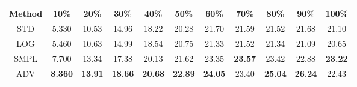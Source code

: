 \documentclass{standalone}
\begin{document}
\begin{tabular}{c|cccccccccc}
      \toprule
      Method & 10\% & 20\% & 30\% & 40\% & 50\% & 60\% & 70\% & 80\% & 90\% & 100\% \\
      \midrule
STD & 5.330 & 10.53 & 14.96 & 18.22 & 20.28 & 21.70 & 21.59 & 21.52 & 21.68 & 21.10\\
LOG & 5.460 & 10.63 & 14.99 & 18.54 & 20.75 & 21.33 & 21.52 & 21.34 & 21.09 & 20.65\\
SMPL & 7.700 & 13.34 & 17.38 & 20.13 & 21.62 & 23.35 & \textbf{23.57} & 23.42 & 22.88 & \textbf{23.22}\\
ADV & \textbf{8.360} & \textbf{13.91} & \textbf{18.66} & \textbf{20.68} & \textbf{22.89} & \textbf{24.05} & 23.40 & \textbf{25.04} & \textbf{26.24} & 22.43\\
  \bottomrule
\end{tabular}
\end{document}
